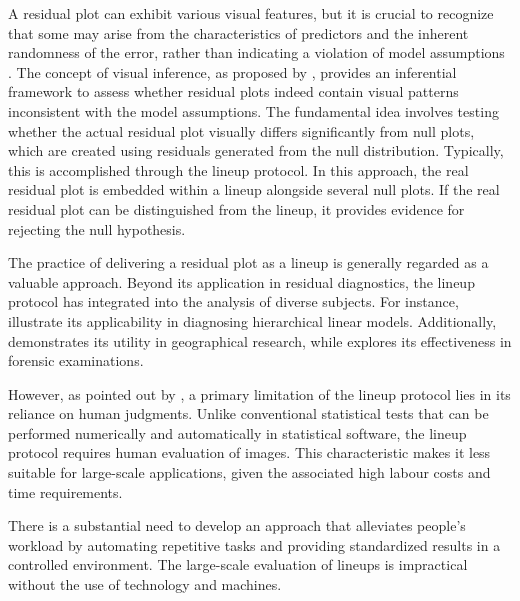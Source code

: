 \documentclass[]{interact}
\theoremstyle{plain}%
\theoremstyle{definition}
\theoremstyle{remark}
\begin{document}
A residual plot can exhibit various visual features, but it is crucial
to recognize that some may arise from the characteristics of predictors
and the inherent randomness of the error, rather than indicating a
violation of model assumptions \citep{li2023plot}. The concept of visual
inference, as proposed by \citet{buja2009statistical}, provides an
inferential framework to assess whether residual plots indeed contain
visual patterns inconsistent with the model assumptions. The fundamental
idea involves testing whether the actual residual plot visually differs
significantly from null plots, which are created using residuals
generated from the null distribution. Typically, this is accomplished
through the lineup protocol. In this approach, the real residual plot is
embedded within a lineup alongside several null plots. If the real
residual plot can be distinguished from the lineup, it provides evidence
for rejecting the null hypothesis.

The practice of delivering a residual plot as a lineup is generally
regarded as a valuable approach. Beyond its application in residual
diagnostics, the lineup protocol has integrated into the analysis of
diverse subjects. For instance,
\cite{loy2013diagnostic, loy2014hlmdiag, loy2015you} illustrate its
applicability in diagnosing hierarchical linear models. Additionally,
\citet{widen2016graphical} demonstrates its utility in geographical
research, while \citet{krishnan2021hierarchical} explores its
effectiveness in forensic examinations.

However, as pointed out by \citet{li2023plot}, a primary limitation of
the lineup protocol lies in its reliance on human judgments. Unlike
conventional statistical tests that can be performed numerically and
automatically in statistical software, the lineup protocol requires
human evaluation of images. This characteristic makes it less suitable
for large-scale applications, given the associated high labour costs and
time requirements.

There is a substantial need to develop an approach that alleviates
people's workload by automating repetitive tasks and providing
standardized results in a controlled environment. The large-scale
evaluation of lineups is impractical without the use of technology and
machines.
\end{document}
